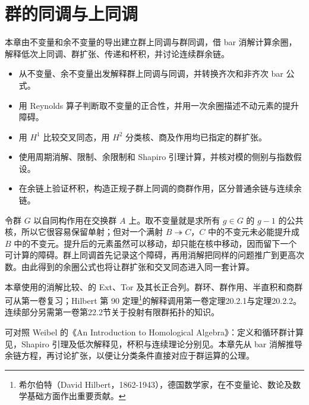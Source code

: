 
\chapter{群的同调与上同调}
\label{b4:ch:11}

\begin{chapterabstract}
本章由不变量和余不变量的导出建立群上同调与群同调，借 bar 消解计算余圈，解释低次上同调、群扩张、传递和杯积，并讨论连续群余链。
\end{chapterabstract}

\begin{learninggoals}
\begin{itemize}
\item 从不变量、余不变量出发解释群上同调与同调，并转换齐次和非齐次 bar 公式。
\item 用 Reynolds 算子判断取不变量的正合性，并用一次余圈描述不动元素的提升障碍。
\item 用 \(H^1\) 比较交叉同态，用 \(H^2\) 分类核、商及作用均已指定的群扩张。
\item 使用周期消解、限制、余限制和 Shapiro 引理计算，并核对模的侧别与指数假设。
\item 在余链上验证杯积，构造正规子群上同调的商群作用，区分普通余链与连续余链。
\end{itemize}
\end{learninggoals}

令群 \(G\) 以自同构作用在交换群 \(A\) 上。取不变量就是求所有 \(g\in G\) 的 \(g-1\) 的公共核，所以它很容易保留单射；但对一个满射 \(B\twoheadrightarrow C\)，\(C\) 中的不变元未必能提升成 \(B\) 中的不变元。提升后的元素虽然可以移动，却只能在核中移动，因而留下一个可计算的障碍。群上同调首先记录这个障碍，再用消解把同样的问题推广到更高次数。由此得到的余圈公式也将让群扩张和交叉同态进入同一套计算。

\ProseParagraphBreak
本章使用的消解比较、的 Ext、Tor 及其长正合列。群环、群作用、半直积和商群可从第一卷复习；Hilbert 第 90 定理\footnote{希尔伯特（David Hilbert，1862-1943），德国数学家，在不变量论、数论及数学基础方面作出重要贡献。}的解释调用第一卷定理20.2.1与定理20.2.2。连续部分另需第一卷第22.2节关于投射有限群拓扑的知识。

\ProseParagraphBreak
可对照 Weibel 的《An Introduction to Homological Algebra》：定义和循环群计算见\cite[Sections 6.1--6.2]{Weibel1994HomologicalAlgebra}，Shapiro 引理及低次解释见\cite[Sections 6.3--6.6]{Weibel1994HomologicalAlgebra}，杯积与连续理论分别见\cite[Section 6.7.1, Section 6.11]{Weibel1994HomologicalAlgebra}。本章先从 bar 消解推导余链方程，再讨论扩张，以便让分类条件直接对应于群运算的公理。

